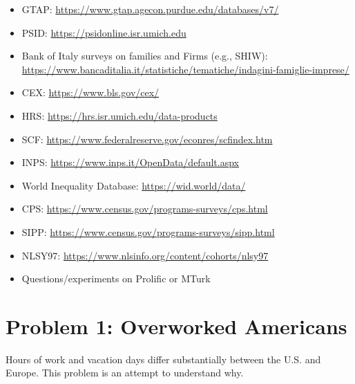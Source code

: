 \documentclass[11pt,a4paper]{article}
\begin{document}
\begin{itemize}
    \item GTAP: \url{https://www.gtap.agecon.purdue.edu/databases/v7/}
    \item PSID: \url{https://psidonline.isr.umich.edu}
    \item Bank of Italy surveys on families and Firms (e.g., SHIW): \\
        \url{https://www.bancaditalia.it/statistiche/tematiche/indagini-famiglie-imprese/}
    \item CEX: \url{https://www.bls.gov/cex/}
    \item HRS: \url{https://hrs.isr.umich.edu/data-products}
    \item SCF: \url{https://www.federalreserve.gov/econres/scfindex.htm}
    \item INPS: \url{https://www.inps.it/OpenData/default.aspx}
    \item World Inequality Database: \url{https://wid.world/data/}
    \item CPS: \url{https://www.census.gov/programs-surveys/cps.html}
    \item SIPP: \url{https://www.census.gov/programs-surveys/sipp.html}
    \item NLSY97: \url{https://www.nlsinfo.org/content/cohorts/nlsy97}
    \item Questions/experiments on Prolific or MTurk
\end{itemize}

\newpage


\section*{Problem 1: Overworked Americans}

Hours of work and vacation days differ substantially between the U.S. and Europe. This problem is an attempt to understand why.
\end{document}

